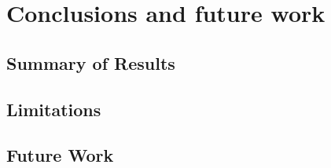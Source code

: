 \chapter[Conclusions and future work]{Conclusions and future work}

\section{Summary of Results}
\section{Limitations}
\section{Future Work}